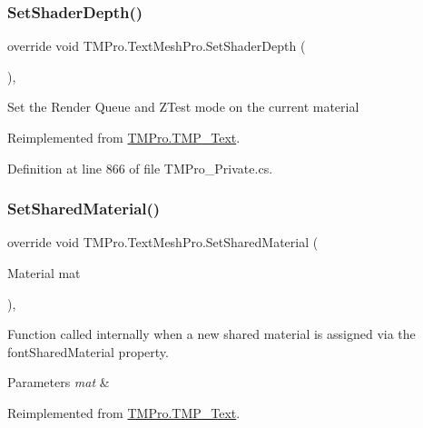 \subsubsection{\texorpdfstring{SetShaderDepth()}{SetShaderDepth()}}
{\footnotesize\ttfamily override void T\+M\+Pro.\+Text\+Mesh\+Pro.\+Set\+Shader\+Depth (\begin{DoxyParamCaption}{ }\end{DoxyParamCaption})\hspace{0.3cm}{\ttfamily [protected]}, {\ttfamily [virtual]}}



Set the Render Queue and Z\+Test mode on the current material 



Reimplemented from \mbox{\hyperlink{class_t_m_pro_1_1_t_m_p___text_a311f4fd9aa77c8cd143b686f555aa579}{T\+M\+Pro.\+T\+M\+P\+\_\+\+Text}}.



Definition at line 866 of file T\+M\+Pro\+\_\+\+Private.\+cs.

\mbox{\label{class_t_m_pro_1_1_text_mesh_pro_a50256541f1e533a8fd3fd4b7830936d8}} 
\subsubsection{\texorpdfstring{SetSharedMaterial()}{SetSharedMaterial()}}
{\footnotesize\ttfamily override void T\+M\+Pro.\+Text\+Mesh\+Pro.\+Set\+Shared\+Material (\begin{DoxyParamCaption}\item[{Material}]{mat }\end{DoxyParamCaption})\hspace{0.3cm}{\ttfamily [protected]}, {\ttfamily [virtual]}}



Function called internally when a new shared material is assigned via the font\+Shared\+Material property. 


\begin{DoxyParams}{Parameters}
{\em mat} & \\
\hline
\end{DoxyParams}


Reimplemented from \mbox{\hyperlink{class_t_m_pro_1_1_t_m_p___text_abccb3148b9e3fceee9b80807d75c0196}{T\+M\+Pro.\+T\+M\+P\+\_\+\+Text}}.



